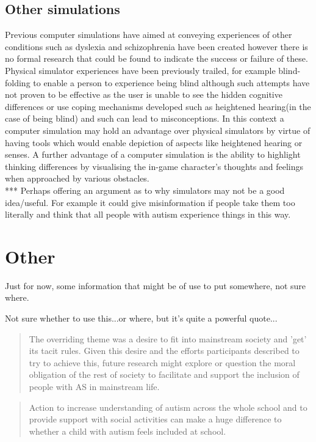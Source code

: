 \documentclass[11pt]{report}
\begin{document}
\subsection{Other simulations}
Previous computer simulations have aimed at conveying experiences of other conditions such as dyslexia and schizophrenia have been created however there is no formal research that could be found to indicate the success or failure of these. 
Physical simulator experiences have been previously trailed, for example blind-folding to enable a person to experience being blind although such attempts have not proven to be effective\cite{dd} as the user is unable to see the hidden cognitive differences or use coping mechanisms developed such as heightened hearing(in the case of being blind) and such can lead to misconceptions. In this context a computer simulation may hold an advantage over physical simulators by virtue of having tools which would enable depiction of aspects like heightened hearing or senses. A further advantage of a computer simulation is the ability to highlight thinking differences by visualising the in-game character's thoughts and feelings when approached by various obstacles. \\

*** Perhaps offering an argument as to why simulators may not be a good idea/useful. For example it could give misinformation if people take them too literally and think that all people with autism experience things in this way.

\section{Other}
Just for now, some information that might be of use to put somewhere, not sure where.

Not sure whether to use this...or where, but it's quite a powerful quote...
\begin{quote}
The overriding theme was a desire to fit into mainstream society and 'get' its tacit rules. Given this desire and the
efforts participants described to try to achieve this, future research might explore or question the moral obligation of the rest of society to facilitate and support the inclusion of people with AS in mainstream life. \cite{aspieway}
\end{quote}

\begin{quote}
Action to increase understanding of autism across the whole school and to provide support with social activities can make a huge difference to whether a child with autism feels included at school.\cite{nasschool}
\end{quote}
\end{document}
